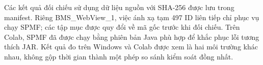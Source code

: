 Các kết quả đối chiếu sử dụng dữ liệu nguồn với SHA-256 được lưu trong manifest. Riêng BMS\_WebView\_1, việc ánh xạ tạm 497 ID liên tiếp chỉ phục vụ chạy SPMF; các tập mục được quy đổi về mã gốc trước khi đối chiếu. Trên Colab, SPMF đã được chạy bằng phiên bản Java phù hợp để khắc phục lỗi tương thích JAR. Kết quả đo trên Windows và Colab được xem là hai môi trường khác nhau, không gộp thời gian thành một phép so sánh kiểm soát đồng nhất.
